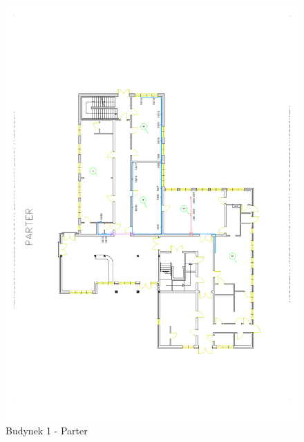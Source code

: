 \newpage
\begin{figure}[H]
  \begin{center}
    \includegraphics[width=\textwidth]{img/s/b1-0.pdf}
    \caption{Budynek 1 - Parter}
  \end{center}
\end{figure}

